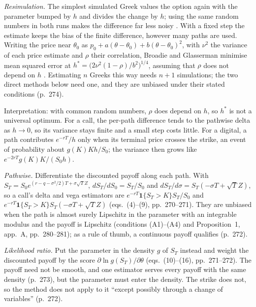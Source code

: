\begin{qfmethod}\label{meth:monte-carlo-greeks}
 \emph{Resimulation.} The simplest simulated Greek values the option again with the parameter bumped by $h$ and divides the change by $h$; using the same random numbers in both runs makes the difference far less noisy \citep[chap.~21, sec.~21.6, pp.~494--495]{s7-hulloptions}. With a fixed step the estimate keeps the bias of the finite difference, however many paths are used. Writing the price near $\theta_0$ as $p_0+a(\theta-\theta_0)+b(\theta-\theta_0)^2$, with $\nu^2$ the variance of each price estimate and $\rho$ their correlation, Broadie and Glasserman minimise mean squared error at $h^*=\bigl(2\nu^2(1-\rho)/b^2\bigr)^{1/4}$, assuming that $\rho$ does not depend on $h$ \citep[sec.~4, p.~274; app.~B, eq.~(26), p.~281]{broadie-glasserman-1996}. Estimating $n$ Greeks this way needs $n+1$ simulations; the two direct methods below need one, and they are unbiased under their stated conditions (p.~274).

Interpretation: with common random numbers, $\rho$ does depend on $h$, so $h^*$ is not a universal optimum. For a call, the per-path difference tends to the pathwise delta as $h\to0$, so its variance stays finite and a small step costs little. For a digital, a path contributes $e^{-rT}/h$ only when its terminal price crosses the strike, an event of probability about $g(K)Kh/S_0$; the variance then grows like $e^{-2rT}g(K)K/(S_0h)$.

\emph{Pathwise.} Differentiate the discounted payoff along each path. With $S_T=S_0e^{(r-q-\sigma^2/2)T+\sigma\sqrt TZ}$, $dS_T/dS_0=S_T/S_0$ and $dS_T/d\sigma=S_T(-\sigma T+\sqrt TZ)$, so a call's delta and vega estimators are $e^{-rT}\mathbf 1\{S_T>K\}S_T/S_0$ and $e^{-rT}\mathbf 1\{S_T>K\}S_T(-\sigma T+\sqrt TZ)$ (eqs.~(4)--(9), pp.~270--271). They are unbiased when the path is almost surely Lipschitz in the parameter with an integrable modulus and the payoff is Lipschitz (conditions (A1)--(A4) and Proposition~1, app.~A, pp.~280--281); as a rule of thumb, a continuous payoff qualifies (p.~272).

\emph{Likelihood ratio.} Put the parameter in the density $g$ of $S_T$ instead and weight the discounted payoff by the score $\partial\ln g(S_T)/\partial\theta$ (eqs.~(10)--(16), pp.~271--272). The payoff need not be smooth, and one estimator serves every payoff with the same density (p.~273), but the parameter must enter the density. The strike does not, so the method does not apply to it ``except possibly through a change of variables'' (p.~272).


\end{qfmethod}
